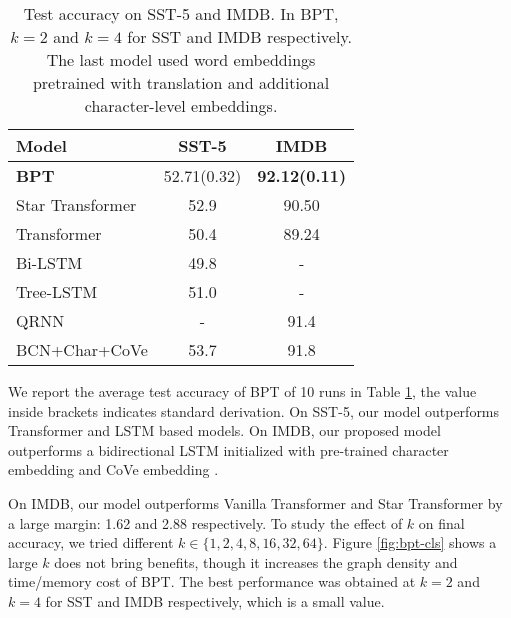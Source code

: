 \documentclass[11pt,a4paper]{article}
\begin{document}
\begin{table}[!htb]
\small\setlength{\tabcolsep}{2pt}
\centering
\begin{tabular}{p{14em}cc}
\toprule
Model                          & SST-5 & IMDB                  \\ \midrule
\bf BPT & 52.71(0.32)       & \bf 92.12(0.11) \\
Star Transformer         & 52.9 & 90.50 \\
Transformer              & 50.4 & 89.24 \\
Bi-LSTM \citep{li2015tree}                  & 49.8 & - \\
Tree-LSTM \citep{socher2013recursive}                & 51.0 & -\\
QRNN \cite{DBLP:conf/iclr/0002MXS17} & - & 91.4  \\ \midrule
BCN+Char+CoVe \cite{mccann2017learned}      & 53.7 & 91.8          \\
\bottomrule
\end{tabular}
\caption{Test accuracy on SST-5 and IMDB. In BPT, $k=2$ and $k=4$ for SST and IMDB respectively. The last model used word embeddings pretrained with translation and additional character-level embeddings. }
\label{tbl:classification}
\end{table}

We report the average test accuracy of BPT of 10 runs in Table \ref{tbl:classification}, the value inside brackets indicates standard derivation. On SST-5, our model outperforms Transformer and LSTM based models. On IMDB, our proposed model outperforms a bidirectional LSTM initialized with pre-trained character embedding and CoVe embedding \cite{mccann2017learned}.

On IMDB, our model outperforms Vanilla Transformer and Star Transformer by a large margin: 1.62 and 2.88 respectively. To study the effect of $k$ on final accuracy, we tried different $k\in\{1,2,4,8,16,32,64\}$. Figure \ref{fig:bpt-cls} shows a large $k$ does not bring benefits, though it increases the graph density and time/memory cost of BPT. The best performance was obtained at $k=2$ and $k=4$ for SST and IMDB respectively, which is a small value.
\end{document}
